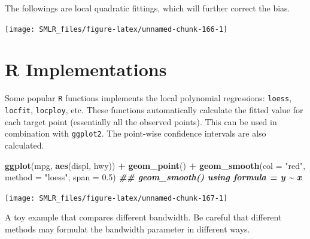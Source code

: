 \documentclass[
]{book}
\newenvironment{Shaded}{\begin{snugshade}}{\end{snugshade}}
\newcommand{\AttributeTok}[1]{\textcolor[rgb]{0.13,0.29,0.53}{#1}}
\newcommand{\DocumentationTok}[1]{\textcolor[rgb]{0.56,0.35,0.01}{\textbf{\textit{#1}}}}
\newcommand{\FloatTok}[1]{\textcolor[rgb]{0.00,0.00,0.81}{#1}}
\newcommand{\FunctionTok}[1]{\textcolor[rgb]{0.13,0.29,0.53}{\textbf{#1}}}
\newcommand{\NormalTok}[1]{#1}
\newcommand{\SpecialCharTok}[1]{\textcolor[rgb]{0.81,0.36,0.00}{\textbf{#1}}}
\newcommand{\StringTok}[1]{\textcolor[rgb]{0.31,0.60,0.02}{#1}}
\theoremstyle{definition}
\theoremstyle{definition}
\theoremstyle{definition}
\theoremstyle{definition}
\theoremstyle{remark}
\begin{document}
The followings are local quadratic fittings, which will further correct the bias.

\begin{center}\texttt{[image: SMLR\_files/figure-latex/unnamed-chunk-166-1]} \end{center}

\hypertarget{r-implementations}{%
\section{R Implementations}\label{r-implementations}}

Some popular \texttt{R} functions implements the local polynomial regressions: \texttt{loess}, \texttt{locfit}, \texttt{locploy}, etc. These functions automatically calculate the fitted value for each target point (essentially all the observed points). This can be used in combination with \texttt{ggplot2}. The point-wise confidence intervals are also calculated.

\begin{Shaded}
\begin{Highlighting}[]
    \FunctionTok{ggplot}\NormalTok{(mpg, }\FunctionTok{aes}\NormalTok{(displ, hwy)) }\SpecialCharTok{+} \FunctionTok{geom\_point}\NormalTok{() }\SpecialCharTok{+}
      \FunctionTok{geom\_smooth}\NormalTok{(}\AttributeTok{col =} \StringTok{"red"}\NormalTok{, }\AttributeTok{method =} \StringTok{"loess"}\NormalTok{, }\AttributeTok{span =} \FloatTok{0.5}\NormalTok{)}
\DocumentationTok{\#\# \textasciigrave{}geom\_smooth()\textasciigrave{} using formula = \textquotesingle{}y \textasciitilde{} x\textquotesingle{}}
\end{Highlighting}
\end{Shaded}

\begin{center}\texttt{[image: SMLR\_files/figure-latex/unnamed-chunk-167-1]} \end{center}

A toy example that compares different bandwidth. Be careful that different methods may formulat the bandwidth parameter in different ways.
\end{document}
